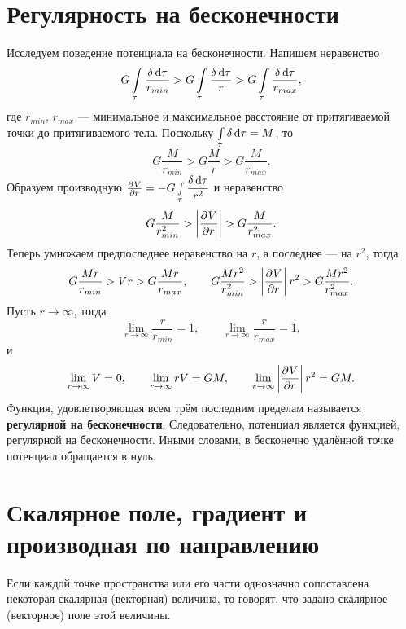 \documentclass[11pt, a4paper]{article}
\theoremstyle{plain}
\theoremstyle{definition}
\theoremstyle{remark}
\begin{document}
\section{Регулярность на бесконечности}
Исследуем поведение потенциала на бесконечности. Напишем неравенство
\begin{equation*}
    G\int\limits_\tau\dfrac{\delta\dif\tau}{r_{min}} >
    G\int\limits_\tau\dfrac{\delta\dif\tau}{r} >
    G\int\limits_\tau\dfrac{\delta\dif\tau}{r_{max}},
\end{equation*}
где $r_{min}$, $r_{max}$ --- минимальное и максимальное расстояние от притягиваемой точки до
притягиваемого тела. Поскольку $\int\limits_\tau\delta\dif\tau = M$, то
\begin{equation*}
    G\dfrac{M}{r_{min}} >
    G\dfrac{M}{r} >
    G\dfrac{M}{r_{max}}.
\end{equation*}
Образуем производную $\pd{V}{r} = -G\int\limits_\tau\dfrac{\delta\dif\tau}{r^2}$ и неравенство
\begin{equation*}
    G\dfrac{M}{r^2_{min}} >
     \left|\dpd{V}{r}\right| >
    G\dfrac{M}{r^2_{max}}.
\end{equation*}
Теперь умножаем предпоследнее неравенство на $r$, а последнее --- на $r^2$, тогда
\begin{equation*}
    G\dfrac{Mr}{r_{min}} >
    Vr >
    G\dfrac{Mr}{r_{max}}, \qquad
    G\dfrac{Mr^2}{r^2_{min}} >
     \left|\dpd{V}{r}\right| r^2 >
    G\dfrac{M r^2}{r^2_{max}}.
\end{equation*}
Пусть $r\to\infty$, тогда
\begin{equation*}
    \lim\limits_{r\to\infty}\dfrac{r}{r_{min}} = 1,\qquad 
    \lim\limits_{r\to\infty}\dfrac{r}{r_{max}} = 1,
\end{equation*}
и
\begin{equation*}
    \lim\limits_{r\to\infty} V = 0,\qquad 
    \lim\limits_{r\to\infty} rV = GM,\qquad
    \lim\limits_{r\to\infty} \left|\dpd{V}{r}\right| r^2 = GM.
\end{equation*}
Функция, удовлетворяющая всем трём последним пределам называется \textbf{регулярной на
бесконечности}. Следовательно, потенциал является функцией, регулярной на бесконечности. Иными словами, в бесконечно удалённой точке потенциал обращается в нуль.

\section{Скалярное поле, градиент и производная по направлению}
Если каждой точке пространства или его части однозначно сопоставлена некоторая скалярная (векторная) величина, то говорят, что задано скалярное (векторное) поле этой величины.
\end{document}
